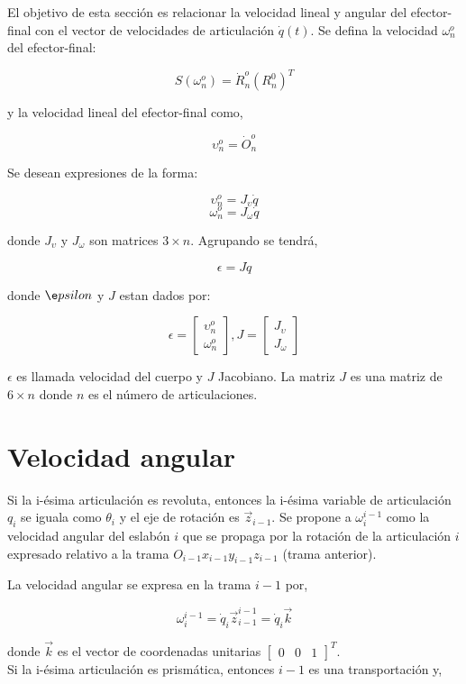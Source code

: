 \documentclass[10pt,a4paper]{article}
\begin{document}
El objetivo de esta sección es relacionar la velocidad lineal y angular del efector-final con el vector de velocidades de articulación $\dot{q}(t)$. Se defina la velocidad $\omega_n^o$ del efector-final:

$$ S(\omega_n^o) = \dot{R}_n^o (R_n^0)^T $$

y la velocidad lineal del efector-final como,

$$ \upsilon_n^o = \dot{O}_n^o $$

Se desean expresiones de la forma:

$$ \upsilon_n^o = J_{\upsilon} \dot{q} $$
$$ \omega_n^o = J_{\omega} \dot{q} $$

donde $J_{\upsilon}$ y $J_{\omega}$ son matrices $3 \times n$. Agrupando se tendrá,

$$ \epsilon = J \dot{q} $$

donde $\e psilon$ y $J$ estan dados por:

$$ \epsilon =
\begin{bmatrix}
	\upsilon_n^o\\
	\omega_n^o
\end{bmatrix},
J =
\begin{bmatrix}
	J_{\upsilon}\\
	J_{\omega}
\end{bmatrix}
$$

$\epsilon$ es llamada velocidad del cuerpo y $J$ Jacobiano. La matriz $J$ es una matriz de $ 6 \times n$ donde $n$ es el número de articulaciones.

\section{Velocidad angular}

Si la i-ésima articulación es revoluta, entonces la i-ésima variable de articulación $q_i$ se iguala como $\theta_i$ y el eje de rotación es $\vec{z}_{i-1}$. Se propone a $\omega_i^{i-1}$ como la velocidad angular del eslabón $i$ que se propaga por la rotación de la articulación $i$ expresado relativo a la trama $O_{i-1} x_{i-1} y_{i-1}  z_{i-1}$ (trama anterior).

La velocidad angular se expresa en la trama $i-1$ por,

$$ \omega_i^{i-1} = \dot{q}_i \vec{z}_{i-1}^{i-1} = \dot{q}_i \vec{k} $$

donde $\vec{k}$ es el vector de coordenadas unitarias
$ \begin{bmatrix}
	0 & 0 & 1
\end{bmatrix}^T$. \\
Si la i-ésima articulación es prismática, entonces $i-1$ es una transportación y,
\end{document}

